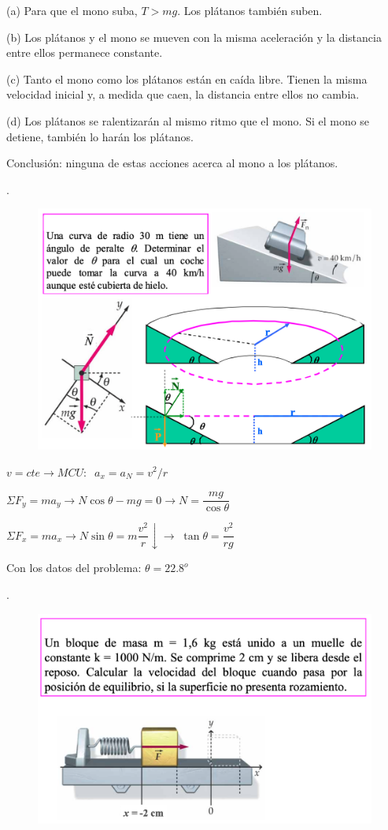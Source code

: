 (a) Para que el mono suba, $T> mg$. Los plátanos también suben.

(b) Los plátanos y el mono se mueven con la misma aceleración y la distancia entre ellos permanece constante. 

 (c) Tanto el mono como los plátanos están en caída libre. Tienen la misma velocidad inicial y, a medida que caen, la distancia entre ellos no cambia.

(d) Los plátanos se ralentizarán al mismo ritmo que el mono. Si el mono se detiene, también lo harán los plátanos.

Conclusión: ninguna de estas acciones acerca al mono a los plátanos.
 

\begin{prob}.
	\begin{figure}[H]
	\centering
	\includegraphics[width=.8\textwidth]{imagenes/imagenes03/T03IM28.png}
	\end{figure}
\end{prob}

\vspace{-4mm} $v=cte \to MCU: \;\; a_x=a_N= {v^2} / r$

$\Sigma F_y=m a_y \to N \cos \theta - mg =0 \to N=\dfrac {mg}{\cos \theta}$

$\Sigma F_x=m a_x\to N \sin \theta = m \dfrac {v^2} r \downarrow \to \;\tan \theta =\dfrac{v^2}{rg}$

Con los datos del problema: $\theta = 22.8^o$






\begin{prob}.
	\begin{figure}[H]
	\centering
	\includegraphics[width=.8\textwidth]{imagenes/imagenes03/T03IM32.png}
	\end{figure}
\end{prob}

